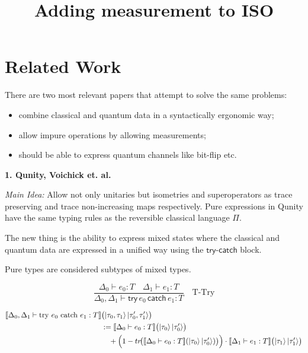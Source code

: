 \documentclass[12pt]{article}
\title{Adding measurement to ISO}
\begin{document}
\maketitle



\section{Related Work}
There are two most relevant papers that attempt to solve the same problems:
\begin{itemize}
  \item combine classical and quantum data in a syntactically ergonomic way;
  \item allow impure operations by allowing measurements;
  \item should be able to express quantum channels like bit-flip etc.
\end{itemize}

\textbf{1. Qunity, Voichick et. al.}
\vspace{0.75em}

\textit{Main Idea:} Allow not only unitaries but isometries and superoperators as trace preserving and trace
non-increasing maps respectively. Pure expressions in Qunity have the same typing rules as the reversible classical
language $\Pi$.

The new thing is the ability to express mixed states where the classical and quantum data are expressed
in a unified way using the $\textsf{try-catch}$ block.

Pure types are considered subtypes of mixed types.

\[
\frac{\Delta_0 \vdash e_0 : T \quad \Delta_1 \vdash e_1 : T}{\Delta_0, \Delta_1 \vdash \textsf{try}\, e_0\, \textsf{catch}\, e_1 : T}
\quad \text{T-Try}
\]

\[
\begin{aligned}
\llbracket \Delta_0, \Delta_1 \vdash \mathrm{try}\ e_0\ \mathrm{catch}\ e_1 : T \rrbracket
&\bigl( \ket{\tau_0,\tau_1}  \ket{\tau'_0,\tau'_1} \bigr) \notag \\
&:= \llbracket \Delta_0 \vdash e_0 : T \rrbracket
\bigl( \ket{\tau_0}  \ket{\tau'_0} \bigr) \notag \\
&\quad + \Bigl( 1 - tr\!\bigl( \llbracket \Delta_0 \vdash e_0 : T \rrbracket
  ( \ket{\tau_0}  \ket{\tau'_0} ) \bigr) \Bigr) \cdot
\llbracket \Delta_1 \vdash e_1 : T \rrbracket
\bigl( \ket{\tau_1}  \ket{\tau'_1} \bigr)
\end{aligned}
\]
\end{document}
